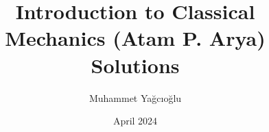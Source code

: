 \documentclass[bachelor, natbib, subf, href]{disser}
\begin{document}
\title{Introduction to Classical Mechanics (Atam P. Arya) Solutions}
\author{Muhammet Yağcıoğlu}
\date{April 2024}
\maketitle
\newpage

\tableofcontents
\lstlistoflistings



\end{document}
